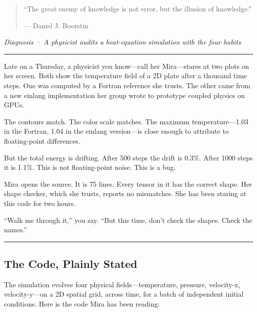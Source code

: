 \documentclass[11pt,]{article}
\begin{document}
\begin{quote}
``The great enemy of knowledge is not error, but the illusion of
knowledge.''

--- Daniel J. Boorstin
\end{quote}

\emph{Diagnosis · A physicist audits a heat-equation simulation with the
four habits}

\begin{center}\rule{0.5\linewidth}{0.4pt}\end{center}

Late on a Thursday, a physicist you know---call her Mira---stares at two
plots on her screen. Both show the temperature field of a 2D plate after
a thousand time steps. One was computed by a Fortran reference she
trusts. The other came from a new einlang implementation her group wrote
to prototype coupled physics on GPUs.

The contours match. The color scale matches. The maximum
temperature---1.03 in the Fortran, 1.04 in the einlang version---is
close enough to attribute to floating-point differences.

But the total energy is drifting. After 500 steps the drift is 0.3\%.
After 1000 steps it is 1.1\%. This is not floating-point noise. This is
a bug.

Mira opens the source. It is 75 lines. Every tensor in it has the
correct shape. Her shape checker, which she trusts, reports no
mismatches. She has been staring at this code for two hours.

``Walk me through it,'' you say. ``But this time, don't check the
shapes. Check the names.''

\begin{center}\rule{0.5\linewidth}{0.4pt}\end{center}

\hypertarget{the-code-plainly-stated}{%
\subsection{The Code, Plainly Stated}\label{the-code-plainly-stated}}

The simulation evolves four physical fields---temperature, pressure,
velocity-x, velocity-y---on a 2D spatial grid, across time, for a batch
of independent initial conditions. Here is the code Mira has been
reading:
\end{document}
